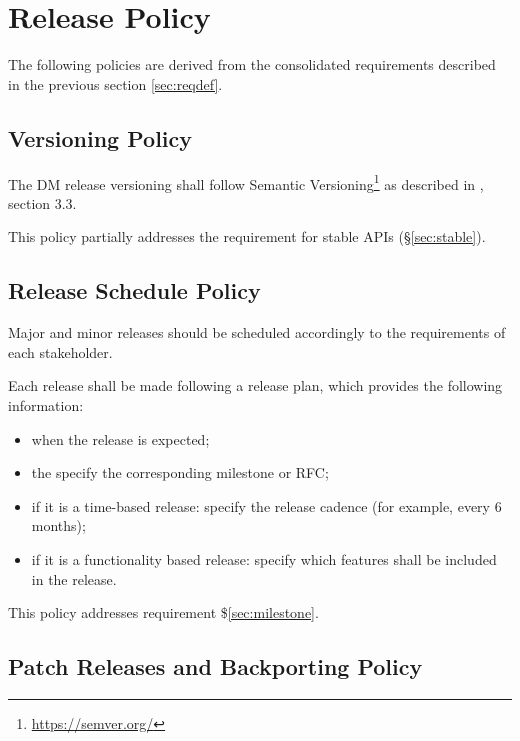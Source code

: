\section{Release Policy} \label{sec:policy}

The following policies are derived from the consolidated requirements described in the previous section \ref{sec:reqdef}.


\subsection{Versioning Policy} \label{sec:versinopolicy}

The DM release versioning shall follow Semantic Versioning\footnote{\url{https://semver.org/}} as described in , section 3.3.

This policy partially addresses the requirement for stable APIs (\S\ref{sec:stable}).



\subsection{Release Schedule Policy} \label{sec:schedulepolicy}

Major and minor releases should be scheduled accordingly to the requirements of each stakeholder.

Each release shall be made following a release plan, which provides the following information:

\begin{itemize}
\item when the release is expected;
\item the specify the corresponding milestone or RFC;
\item if it is a time-based release: specify the release cadence (for example, every 6 months);
\item if it is a functionality based release: specify which features shall be included in the release.
\end{itemize}

This policy addresses requirement \$\ref{sec:milestone}.


\subsection{Patch Releases and Backporting Policy} \label{sec:patchpolicy}

